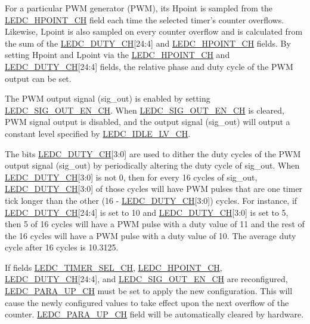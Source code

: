 \documentclass[main\_\_EN.tex]{subfiles}
\begin{document}
For a particular PWM generator (PWM), its Hpoint is sampled from the \hyperref[fielddesc:LEDCHPOINTCHN]{LEDC\_HPOINT\_CH} field each time the selected timer’s counter overflows. Likewise, Lpoint is also sampled on every counter overflow and is calculated from the sum of the \hyperref[fielddesc:LEDCDUTYCHN]{LEDC\_DUTY\_CH}[24:4] and \hyperref[fielddesc:LEDCHPOINTCHN]{LEDC\_HPOINT\_CH} fields. By setting Hpoint and Lpoint via the \hyperref[fielddesc:LEDCHPOINTCHN]{LEDC\_HPOINT\_CH} and \hyperref[fielddesc:LEDCDUTYCHN]{LEDC\_DUTY\_CH}[24:4] fields, the relative phase and duty cycle of the PWM output can be set.

The PWM output signal (sig\_out) is enabled by setting \hyperref[fielddesc:LEDCSIGOUTENCHN]{LEDC\_SIG\_OUT\_EN\_CH}. When \hyperref[fielddesc:LEDCSIGOUTENCHN]{LEDC\_SIG\_OUT\_EN\_CH} is cleared, PWM signal output is disabled, and the output signal (sig\_out) will output a constant level specified by \hyperref[fielddesc:LEDCIDLELVCHN]{LEDC\_IDLE\_LV\_CH}.

The bits \hyperref[fielddesc:LEDCDUTYCHN]{LEDC\_DUTY\_CH}[3:0] are used to dither the duty cycles of the PWM output signal (sig\_out) by periodically altering the duty cycle of sig\_out. When \hyperref[fielddesc:LEDCDUTYCHN]{LEDC\_DUTY\_CH}[3:0] is not 0, then for every 16 cycles of sig\_out, \hyperref[fielddesc:LEDCDUTYCHN]{LEDC\_DUTY\_CH}[3:0] of those cycles will have PWM pulses that are one timer tick longer than the other (16 - \hyperref[fielddesc:LEDCDUTYCHN]{LEDC\_DUTY\_CH}[3:0]) cycles. For instance, if \hyperref[fielddesc:LEDCDUTYCHN]{LEDC\_DUTY\_CH}[24:4] is set to 10 and \hyperref[fielddesc:LEDCDUTYCHN]{LEDC\_DUTY\_CH}[3:0] is set to 5, then 5 of 16 cycles will have a PWM pulse with a duty value of 11 and the rest of the 16 cycles will have a PWM pulse with a duty value of 10. The average duty cycle after 16 cycles is 10.3125.

If fields \hyperref[fielddesc:LEDCTIMERSELCHN]{LEDC\_TIMER\_SEL\_CH}, \hyperref[fielddesc:LEDCHPOINTCHN]{LEDC\_HPOINT\_CH}, \hyperref[fielddesc:LEDCDUTYCHN]{LEDC\_DUTY\_CH}[24:4], and \hyperref[fielddesc:LEDCSIGOUTENCHN]{LEDC\_SIG\_OUT\_EN\_CH} are reconfigured, \hyperref[fielddesc:LEDCPARAUPCHN]{LEDC\_PARA\_UP\_CH} must be set to apply the new configuration. This will cause the newly configured values to take effect upon the next overflow of the counter. \hyperref[fielddesc:LEDCPARAUPCHN]{LEDC\_PARA\_UP\_CH} field will be automatically cleared by hardware.
\end{document}
